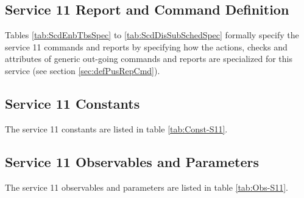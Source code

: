 \documentclass{pnp_article}
\begin{document}
\subsection{Service 11 Report and Command Definition}\label{sec:serv11RepCmdDef}
Tables \ref{tab:ScdEnbTbsSpec} to \ref{tab:ScdDisSubSchedSpec} formally specify the service 11 commands and reports by specifying how the actions, checks and attributes of generic out-going commands and reports are specialized for this service (see section \ref{sec:defPusRepCmd}). 


\newpage
{}
\newpage
{}

\newpage
{}

\newpage
{}

\newpage
{}

\newpage
{}

\newpage
{}



\subsection{Service 11 Constants}\label{sec:serv11Const}
The service 11 constants are listed in table \ref{tab:Const-S11}.    



\subsection{Service 11 Observables and Parameters}\label{sec:serv11ObsPar}
The service 11 observables and parameters are listed in table \ref{tab:Obs-S11}.
\end{document}
